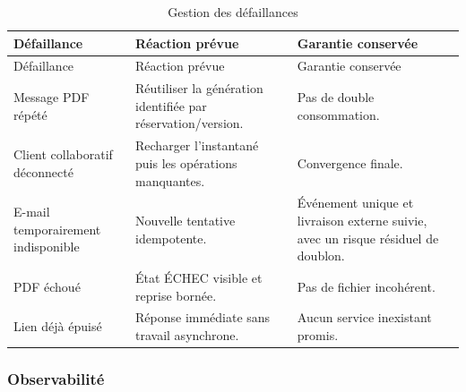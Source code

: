 \begingroup\small\setlength{\tabcolsep}{3pt}\renewcommand{\arraystretch}{1.25}
\begin{longtable}{|P{0.22\textwidth}|P{0.36\textwidth}|P{0.35\textwidth}|}
\caption{Gestion des défaillances}\\
\hline
Défaillance & Réaction prévue & Garantie conservée \\ \hline
\endfirsthead
\hline
Défaillance & Réaction prévue & Garantie conservée \\ \hline
\endhead
\endfoot

Message PDF répété & Réutiliser la génération identifiée par réservation/version. & Pas de double consommation. \\ \hline

Client collaboratif déconnecté & Recharger l'instantané puis les opérations manquantes. & Convergence finale. \\ \hline

E-mail temporairement indisponible & Nouvelle tentative idempotente. & Événement unique et livraison externe suivie, avec un risque résiduel de doublon. \\ \hline

PDF échoué & État ÉCHEC visible et reprise bornée. & Pas de fichier incohérent. \\ \hline

Lien déjà épuisé & Réponse immédiate sans travail asynchrone. & Aucun service inexistant promis. \\ \hline

\end{longtable}\endgroup

\subsubsection{Observabilité}

